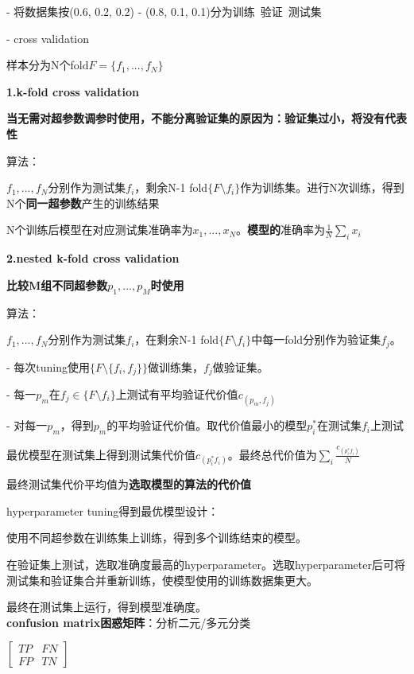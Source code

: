 \documentclass[UTF8]{ctexart}
\begin{document}
  - 将数据集按(0.6, 0.2, 0.2) - (0.8, 0.1, 0.1)分为训练\ 验证\ 测试集

  - cross validation

  \quad 样本分为N个fold$F = \{f_1, ..., f_N\}$

  \quad \textbf{1.k-fold cross validation}

  \quad \quad \textbf{当无需对超参数调参时使用，不能分离验证集的原因为：验证集过小，将没有代表性}

  \quad \quad 算法：

  \quad \quad \quad $f_1, ..., f_N$分别作为测试集$f_i$，剩余N-1 fold$\{F\setminus f_i\}$作为训练集。进行N次训练，得到N个\textbf{同一超参数}产生的训练结果
  
  \quad \quad \quad N个训练后模型在对应测试集准确率为${x_1, ..., x_N}$。\textbf{模型的}准确率为$\frac{1}{N}\sum_ix_i$

  \quad \textbf{2.nested k-fold cross validation}

  \quad \quad \textbf{比较M组不同超参数$p_1, ..., p_M$时使用}

  \quad \quad 算法：
  
  \quad \quad \quad $f_1, ..., f_N$分别作为测试集$f_i$，在剩余N-1 fold$\{F\setminus f_i\}$中每一fold分别作为验证集$f_j$。

  \quad \quad \quad - 每次tuning使用$\{F\setminus \{f_i, f_j\}\}$做训练集，$f_j$做验证集。

  \quad \quad \quad - 每一$p_m$在$f_j \in \{F \setminus f_i\}$上测试有平均验证代价值$c_{(p_m, f_j)}$

  \quad \quad \quad - 对每一$p_m$，得到$p_m$的平均验证代价值。取代价值最小的模型$p^*_i$在测试集$f_i$上测试

  \quad \quad \quad 最优模型在测试集上得到测试集代价值$c_{(p^*_i f_i)}$。最终总代价值为$\sum_i\frac{c_{(p^*_i f_i)} }{N}$

  \quad \quad \quad 最终测试集代价平均值为\textbf{选取模型的算法的代价值}

  hyperparameter tuning得到最优模型设计：
  
  \quad 使用不同超参数在训练集上训练，得到多个训练结束的模型。
  
  \quad 在验证集上测试，选取准确度最高的hyperparameter。选取hyperparameter后可将测试集和验证集合并重新训练，使模型使用的训练数据集更大。
  
  \quad 最终在测试集上运行，得到模型准确度。\\
\textbf{confusion matrix困惑矩阵}：分析二元/多元分类
  
  $\begin{bmatrix}
    TP & FN \\
    FP & TN
  \end{bmatrix}$
\end{document}
